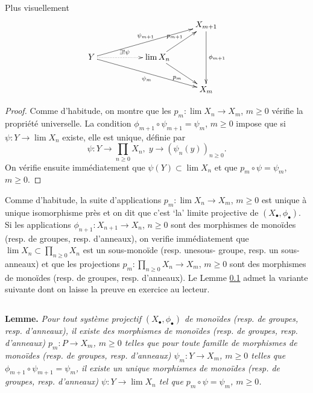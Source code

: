 \documentclass[a4paper, oneside, 12pt]{book}
\theoremstyle{definition} %
\begin{document}
  Plus visuellement
 $$\xymatrix{
 &&&X_{m+1}\ar[dd]^{\phi_{m+1}}\\
 Y\ar@{.>}[rr]^{\exists ! \psi}\ar[urrr]^{\psi_{m+1}}\ar[drrr]_{\psi_m}&&\lim X_n\ar[ur]^{p_{m+1}}\ar[dr]_{p_m}&\\
 &&&X_m
 }$$
 \begin{proof} Comme d'habitude, on montre que les $p_m:\lim X_n\rightarrow X_m$, $m\geq 0$ vérifie la propriété universelle. La condition  $\phi_{m+1}\circ \psi_{m+1}=\psi_m$, $m\geq 0$ impose que si $\psi:Y\rightarrow  \lim X_n$ existe, elle est unique, définie par 
  $$\psi:Y\rightarrow\prod_{n\geq 0}X_n,\; y\rightarrow (\psi_n(y))_{n\geq 0}.$$
  On vérifie ensuite immédiatement que $\psi(Y)\subset  \lim X_n$ et que $p_m\circ \psi=\psi_m$, $m\geq 0.$
 \end{proof}
  Comme d'habitude, la suite d'applications  $p_m:\lim X_n\rightarrow X_m$, $m\geq 0$ est unique à unique isomorphisme près et on dit que  c'est `la' limite projective   de $(X_\bullet,\phi_\bullet)$.  \\
 
 
  Si les applications $\phi_{n+1}:X_{n+1}\rightarrow X_n$, $n\geq 0$ sont des morphismes de monoïdes (resp. de groupes, resp. d'anneaux), on verifie immédiatement que   $ \lim X_n\subset \prod_{n\geq 0} X_n$ est un sous-monoïde  (resp. unesous- groupe, resp. un sous-anneaux) et que les projections  $p_m:\prod_{n\geq 0}X_n\rightarrow X_m$, $m\geq 0$ sont des morphismes de monoïdes (resp. de groupes, resp. d'anneaux). Le Lemme \ref{LimProj} admet la variante suivante dont on laisse la preuve en exercice au lecteur.
 
  \subsection{}\label{LimProj}\textbf{Lemme.}   \textit{Pour tout système projectif $(X_\bullet,\phi_\bullet)$ de monoïdes (resp. de groupes, resp. d'anneaux),  il existe des morphismes de monoïdes (resp. de groupes, resp. d'anneaux) $p_m:P\rightarrow X_m$, $m\geq 0$ telles que pour toute famille  de morphismes de monoïdes (resp. de groupes, resp. d'anneaux) $\psi_m:Y\rightarrow X_m$, $m\geq 0$ telles que $\phi_{m+1}\circ \psi_{m+1}=\psi_m$, il existe un  unique morphismes de monoïdes (resp. de groupes, resp. d'anneaux) $\psi:Y\rightarrow \lim X_n$ tel  que $p_m\circ \psi=\psi_m$, $m\geq 0$.}\\
  
  
\end{document}
